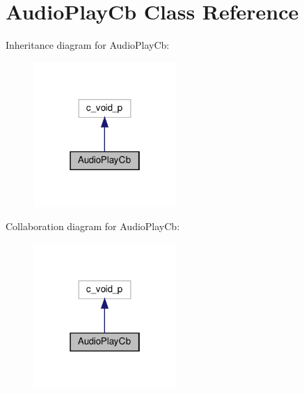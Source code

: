 \hypertarget{classvlc_1_1_audio_play_cb}{}\section{Audio\+Play\+Cb Class Reference}
\label{classvlc_1_1_audio_play_cb}


Inheritance diagram for Audio\+Play\+Cb\+:
\nopagebreak
\begin{figure}[H]
\begin{center}
\leavevmode
\includegraphics[width=154pt]{classvlc_1_1_audio_play_cb__inherit__graph}
\end{center}
\end{figure}


Collaboration diagram for Audio\+Play\+Cb\+:
\nopagebreak
\begin{figure}[H]
\begin{center}
\leavevmode
\includegraphics[width=154pt]{classvlc_1_1_audio_play_cb__coll__graph}
\end{center}
\end{figure}


